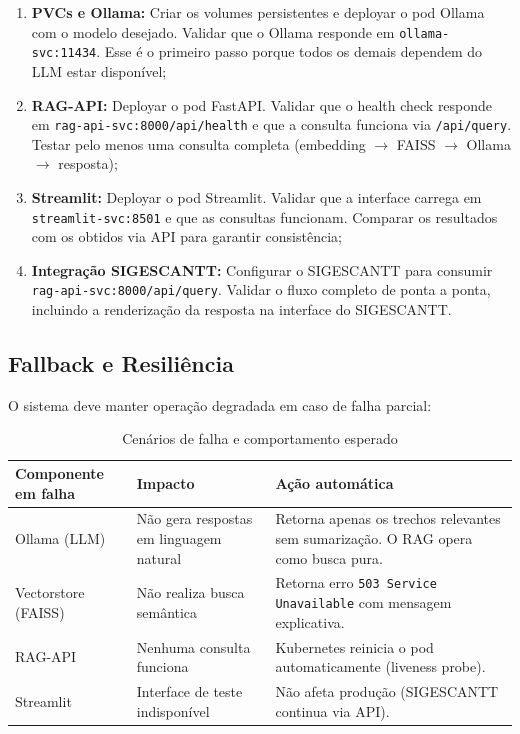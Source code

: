 \documentclass[12pt, a4paper]{article}
\begin{document}
\begin{enumerate}[label=\textbf{Fase~\arabic*.}]
  \item \textbf{PVCs e Ollama:} Criar os volumes persistentes e deployar o pod Ollama com o modelo desejado. Validar que o Ollama responde em \texttt{ollama-svc:11434}. Esse é o primeiro passo porque todos os demais dependem do LLM estar disponível;

  \item \textbf{RAG-API:} Deployar o pod FastAPI. Validar que o health check responde em \texttt{rag-api-svc:8000/api/health} e que a consulta funciona via \texttt{/api/query}. Testar pelo menos uma consulta completa (embedding $\rightarrow$ FAISS $\rightarrow$ Ollama $\rightarrow$ resposta);

  \item \textbf{Streamlit:} Deployar o pod Streamlit. Validar que a interface carrega em \texttt{streamlit-svc:8501} e que as consultas funcionam. Comparar os resultados com os obtidos via API para garantir consistência;

  \item \textbf{Integração SIGESCANTT:} Configurar o SIGESCANTT para consumir \\ \texttt{rag-api-svc:8000/api/query}. Validar o fluxo completo de ponta a ponta, incluindo a renderização da resposta na interface do SIGESCANTT.
\end{enumerate}

\subsection{Fallback e Resiliência}

O sistema deve manter operação degradada em caso de falha parcial:

\begin{table}[H]
\centering
\small
\caption{Cenários de falha e comportamento esperado}
\label{tab:fallback}
\begin{tabularx}{\textwidth}{l X X}
\toprule
\textbf{Componente em falha} & \textbf{Impacto} & \textbf{Ação automática} \\
\midrule
Ollama (LLM) & Não gera respostas em linguagem natural & Retorna apenas os trechos relevantes sem sumarização. O RAG opera como busca pura. \\
Vectorstore (FAISS) & Não realiza busca semântica & Retorna erro \texttt{503 Service Unavailable} com mensagem explicativa. \\
RAG-API & Nenhuma consulta funciona & Kubernetes reinicia o pod automaticamente (liveness probe). \\
Streamlit & Interface de teste indisponível & Não afeta produção (SIGESCANTT continua via API). \\
\bottomrule
\end{tabularx}
\end{table}
\end{document}
